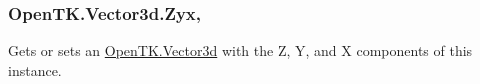 \hypertarget{struct_open_t_k_1_1_vector3d_a858976422e349beaf8e1de8153d2eece}{
\subsubsection[{Zyx}]{ Open\-T\-K.\-Vector3d.\-Zyx\hspace{0.3cm}{\ttfamily [get]}, {\ttfamily [set]}}}\label{struct_open_t_k_1_1_vector3d_a858976422e349beaf8e1de8153d2eece}


Gets or sets an \hyperlink{struct_open_t_k_1_1_vector3d}{Open\-T\-K.\-Vector3d} with the Z, Y, and X components of this instance. 

